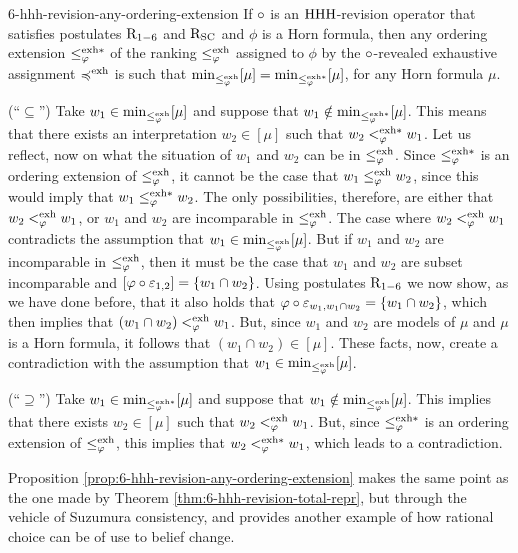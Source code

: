\begin{prp}{}{6-hhh-revision-any-ordering-extension}
	If $\circ$ is an ${\mathrm{HHH}}$-revision operator that satisfies postulates $\mathrm{R}_{1-6}$ and $\mathrm{R}_{{\mathrm{SC}}}$
	and $\phi$ is a Horn formula, 
	then any ordering extension $\le^{{\operatorname{exh}}\ast}_{\varphi}$ of the ranking $\le^{{\operatorname{exh}}}_{\varphi}$ 
	assigned to $\phi$ by the $\circ$-revealed exhaustive assignment $\preccurlyeq^{{\operatorname{exh}}}$
	is such that 
	${\operatorname{min}}_{\le^{{\operatorname{exh}}}_{\varphi}}[\mu]={\operatorname{min}}_{\le^{{\operatorname{exh}}\ast}_{\varphi}}[\mu]$,
	for any Horn formula $\mu$.
\end{prp}
\begin{prf*}{}{}%
	(``$\subseteq$'')
	Take $w_1\in{\operatorname{min}}_{\le^{{\operatorname{exh}}}_{\varphi}}[\mu]$ and suppose 
	that $w_1\notin{\operatorname{min}}_{\le^{{\operatorname{exh}}\ast}_{\varphi}}[\mu]$.
	This means that there exists an interpretation $w_2\in[\mu]$
	such that $w_2<^{{\operatorname{exh}}\ast}_{\varphi}w_1$. 
	Let us reflect, now on what the situation of $w_1$ and $w_2$ can be in $\le^{{\operatorname{exh}}}_{\varphi}$.
	Since $\le^{{\operatorname{exh}}\ast}_{\varphi}$ is an ordering extension of $\le^{{\operatorname{exh}}}_{\varphi}$,
	it cannot be the case that $w_1\le^{{\operatorname{exh}}}_{\varphi}w_2$, since this would imply that 
	$w_1\le^{{\operatorname{exh}}\ast}_{\varphi}w_2$.
	The only possibilities, therefore, are either that $w_2 <^{{\operatorname{exh}}}_{\varphi}w_1$,
	or $w_1$ and $w_2$ are incomparable in $\le^{{\operatorname{exh}}}_{\varphi}$.
	The case where $w_2 <^{{\operatorname{exh}}}_{\varphi}w_1$ contradicts the assumption that $w_1\in{\operatorname{min}}_{\le^{{\operatorname{exh}}}_{\varphi}}[\mu]$.
	But if $w_1$ and $w_2$ are incomparable in $\le^{{\operatorname{exh}}}_{\varphi}$,
	then it must be the case that $w_1$ and $w_2$ are subset incomparable
	and $[\varphi\circ\varepsilon_{1,2}]=\{w_1\cap w_2\}$.
	Using postulates $\mathrm{R}_{1-6}$ we now show, as we have done before,
	that it also holds that $\varphi\circ\varepsilon_{w_1,w_1\cap w_2}=\{w_1\cap w_2\}$, 
	which then implies that $(w_1\cap w_2) <^{{\operatorname{exh}}}_{\varphi}w_1$. 
	But, since $w_1$ and $w_2$ are models of $\mu$ and $\mu$ is a Horn formula,
	it follows that $(w_1\cap w_2)\in[\mu]$.
	These facts, now, create a contradiction with the 
	assumption that $w_1\in{\operatorname{min}}_{\le^{{\operatorname{exh}}}_{\varphi}}[\mu]$.

	(``$\supseteq$'')
	Take $w_1\in{\operatorname{min}}_{\le^{{\operatorname{exh}}\ast}_{\varphi}}[\mu]$ and 
	suppose that $w_1\notin{\operatorname{min}}_{\le^{{\operatorname{exh}}}_{\varphi}}[\mu]$.
	This implies that there exists $w_2\in[\mu]$
	such that $w_2<^{{\operatorname{exh}}}_{\varphi}w_1$.
	But, since $\le^{{\operatorname{exh}}\ast}_{\varphi}$ is an ordering extension of $\le^{{\operatorname{exh}}}_{\varphi}$,
	this implies that $w_2<^{{\operatorname{exh}}\ast}_{\varphi}w_1$,
	which leads to a contradiction.
\end{prf*}

Proposition \ref{prop:6-hhh-revision-any-ordering-extension} makes the same point
as the one made by Theorem \ref{thm:6-hhh-revision-total-repr},
but through the vehicle of Suzumura consistency, and provides 
another example of how rational choice can be of use to belief change.

